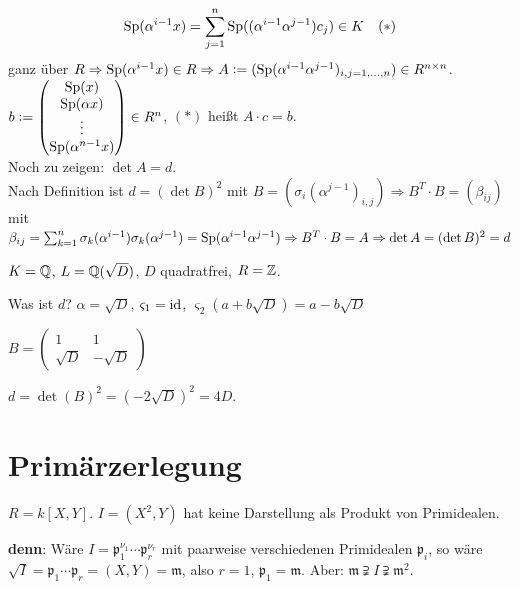 \documentclass[a4paper, 10pt]{report}
\begin{document}
\begin{Bew}
\[
\mathrm{Sp}(\alpha^{i-1} x) = \sum_{j=1}^n
\mathrm{Sp}((\alpha^{i-1}\alpha^{j-1})c_j) \in K \quad (*)
\]
ganz über $R
\Rightarrow \mathrm{Sp}(\alpha^{i-1}x) \in R \Rightarrow A \mathrel{\mathop:}=
(\mathrm{Sp}(\alpha^{i-1} \alpha^{j-1})_{i,j = 1, \dots, n}) \in R^{n \times n}$.\\
$b \mathrel{\mathop:}= \begin{pmatrix} \mathrm{Sp}(x)\\ \mathrm{Sp}(\alpha x)\\ \vdots \\
\mathrm{Sp}(\alpha^{n-1}x) \end{pmatrix} \in R^n$, $(*)$ heißt $A \cdot c = b$.\\
Noch zu zeigen: $\det A = d$.\\
Nach Definition ist $d = (\det B)^2$ mit $B = (\sigma_i(\alpha^{j-1})_{i,j})
\Rightarrow B^T \cdot B = (\beta_{ij})$ mit $\beta_{ij} = \sum_{k=1}^n
\sigma_k(\alpha^{i-1}) \sigma_k(\alpha^{j-1}) = \mathrm{Sp}(\alpha^{i-1}
\alpha^{j-1}) \Rightarrow B^T \cdot B = A \Rightarrow \det A = (\det B)^2 =
d$
\end{Bew}

\begin{nnBsp}
$K=\mathbb{Q}$, $L=\mathbb{Q}(\sqrt{D})$, $D$ quadratfrei, $R=\mathbb{Z}$.

Was ist $d$? $\alpha = \sqrt{D}$, $\varsigma_1=\mathrm{id}$, $\varsigma_2(a+b\sqrt{D})=a-b\sqrt{D}$

$B=\left(\begin{array}{cc}1&1\\\sqrt{D}&-\sqrt{D}\end{array}\right)$

$d=\det(B)^2=(-2\sqrt{D})^2=4D$.

\end{nnBsp}

\section{Primärzerlegung}

\begin{nnBsp}
$R = k[X,Y]$. $I = (X^2, Y)$ hat keine Darstellung als Produkt von Primidealen.

\textbf{denn}: Wäre $I = \mathfrak{p}_1^{\nu_1} \cdots \mathfrak{p}_r^{\nu_r}$ mit paarweise verschiedenen Primidealen $\mathfrak{p}_i$, so wäre $\sqrt{I} = \mathfrak{p}_1 \cdots \mathfrak{p}_r = (X,Y) = \mathfrak{m}$, also $r = 1$, $\mathfrak{p}_1 = \mathfrak{m}$. Aber: $\mathfrak{m} \supsetneqq I \supsetneqq \mathfrak{m}^2$.

\end{nnBsp}
\end{document}
